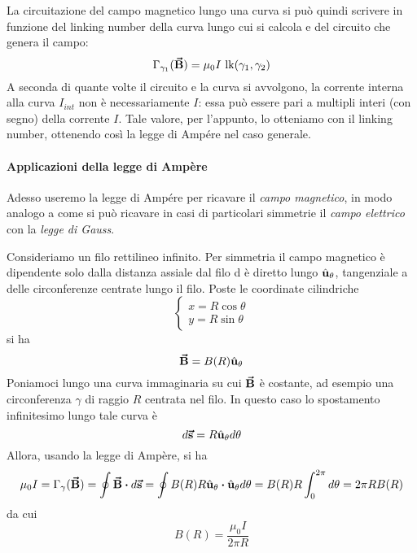 La circuitazione del campo magnetico lungo una curva si può quindi scrivere in funzione del linking number della curva lungo cui si calcola e del circuito che genera il campo:
\begin{equation*}
	\Gamma_{\gamma_1}(\vba{B})=\mu_0 I\ \textrm{lk}(\gamma_1,\gamma_2)
\end{equation*}
A seconda di quante volte il circuito e la curva si avvolgono, la corrente interna alla curva $I_{int}$ non è necessariamente $I$: essa può essere pari a multipli interi (con segno) della corrente $I$. Tale valore, per l'appunto, lo otteniamo con il linking number, ottenendo così la legge di Ampére nel caso generale.
\paragraph{Applicazioni della legge di Ampère}
Adesso useremo la legge di Ampére per ricavare il \textit{campo magnetico}, in modo analogo a come si può ricavare in casi di particolari simmetrie il \textit{campo elettrico} con la \textit{legge di Gauss}.
\begin{examplewt}
	Consideriamo un filo rettilineo infinito. Per simmetria il campo magnetico è dipendente solo dalla distanza assiale dal filo d è diretto lungo $\hat{\mathbf{u}}_\theta$, tangenziale a delle circonferenze centrate lungo il filo. Poste le coordinate cilindriche
	\begin{equation*}
		\begin{cases}
			x=R\cos\theta\\
			y=R\sin\theta
		\end{cases}
	\end{equation*}
	si ha
	\begin{equation*}
		\vb*{\va{B}}=B(R)\hat{\mathbf{u}}_\theta
	\end{equation*}
	Poniamoci lungo una curva immaginaria su cui $\vb*{\va{B}}$ è costante, ad esempio una circonferenza $\gamma$ di raggio $R$ centrata nel filo. In questo caso lo spostamento infinitesimo lungo tale curva è
	\begin{equation*}
		d\vb*{\va{s}}=R\hat{\mathbf{u}}_\theta d\theta
	\end{equation*}
	Allora, usando la legge di Ampère, si ha
	\begin{equation*}
		\mu_0I=\Gamma_{\gamma}(\vba{B})=\oint\vba{B}\vdot d\vba{s}=\oint B(R)R\vbh{u}_\theta\vdot\vbh{u}_{\theta}d\theta=B(R)R\int_{0}^{2\pi}d\theta=2\pi R B(R)
	\end{equation*}
	da cui
	\begin{equation}
		B(R)=\frac{\mu_0 I}{2\pi R}
	\end{equation}
\end{examplewt}

